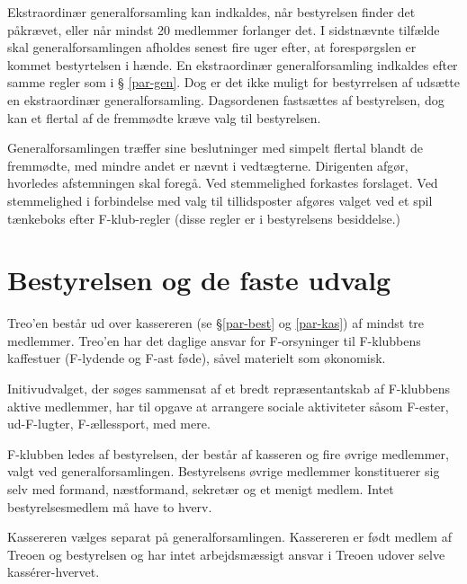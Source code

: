 \documentclass[a4paper,12pt,danish]{article}
\begin{document}
\begin{list}
\item Ekstraordin{\ae}r generalforsamling kan indkaldes, n{\aa}r
  bestyrelsen finder det p{\aa}kr{\ae}vet, eller n{\aa}r mindst 20 medlemmer 
  forlanger det. I sidstn{\ae}vnte tilf{\ae}lde skal generalforsamlingen afholdes 
	senest fire uger efter, at foresp{\o}rgslen er kommet bestyrtelsen i
	h{\ae}nde.
  En ekstraordin{\ae}r generalforsamling indkaldes efter samme regler som i \S
  \ref{par-gen}. Dog er det ikke muligt for bestyrrelsen af uds{\ae}tte en ekstraordinær
  generalforsamling. Dagsordenen fasts{\ae}ttes af bestyrelsen, dog kan et flertal 
  af de fremm{\o}dte kr{\ae}ve valg til bestyrelsen. 
  
\item \label{gen-regler} Generalforsamlingen tr{\ae}ffer sine beslutninger med 
  simpelt flertal blandt de fremm{\o}dte, med mindre andet er n{\ae}vnt i vedt{\ae}gterne.
  Dirigenten afg{\o}r, hvorledes afstemningen skal foreg{\aa}.
  Ved stemmelighed forkastes forslaget. 
  Ved stemmelighed i forbindelse med valg til tillidsposter afg{\o}res valget 
  ved et spil t{\ae}nkeboks efter F-klub-regler (disse regler er i bestyrelsens besiddelse.)

\section{Bestyrelsen og de faste udvalg}

\item Treo'en best{\aa}r ud over kassereren (se \S \ref{par-best} og
  \ref{par-kas}) af mindst tre medlemmer. Treo'en har det daglige
  ansvar for F-orsyninger til F-klubbens kaffestuer (F-lydende og F-ast f{\o}de),
  s{\aa}vel materielt som {\o}konomisk.
  
\item Initivudvalget, der s{\o}ges sammensat af et bredt
  repr{\ae}sentantskab af F-klubbens aktive medlemmer, har til opgave at
  arrangere sociale aktiviteter s{\aa}som F-ester, ud-F-lugter,
  F-{\ae}llessport, med mere.
  
\item \label{par-best} F-klubben ledes af bestyrelsen, der best{\aa}r
  af kasseren og fire {\o}vrige medlemmer, valgt ved
  generalforsamlingen.  Bestyrelsens {\o}vrige medlemmer konstituerer sig
  selv med formand, n{\ae}stformand, sekret{\ae}r og et menigt medlem. Intet
  bestyrelsesmedlem m{\aa} have to hverv.

\item \label{par-kas} Kassereren v{\ae}lges separat p{\aa}
  generalforsamlingen.  Kassereren er f{\o}dt medlem af Treoen og
  bestyrelsen og har intet arbejdsm{\ae}ssigt ansvar i Treoen udover
  selve kass\'{e}rer-hvervet.


\end{list}
\end{document}
